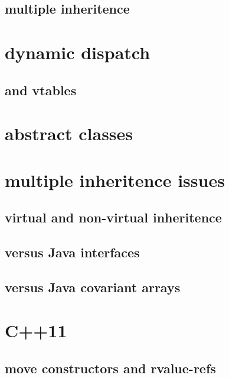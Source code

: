 

\subsection{multiple inheritence}



\section{dynamic dispatch}



\subsection{and vtables}



\section{abstract classes}



\section{multiple inheritence issues}

\subsection{virtual and non-virtual inheritence}



\subsection{versus Java interfaces}

\subsection{versus Java covariant arrays}

\section{C++11}

\subsection{move constructors and rvalue-refs}


